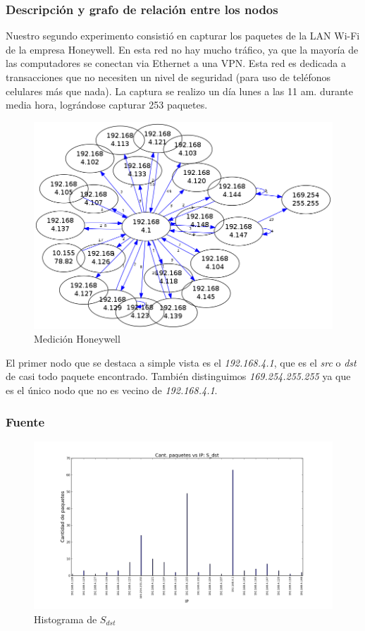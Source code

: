 \subsubsection{Descripción y grafo de relación entre los nodos}

Nuestro segundo experimento consistió en capturar los paquetes de la LAN Wi-Fi de la empresa Honeywell. En esta red no hay mucho tráfico, ya que la mayoría de las computadores se conectan via Ethernet a una VPN. Esta red es dedicada a transacciones que no necesiten un nivel de seguridad (para uso de teléfonos celulares más que nada). La captura se realizo un día lunes a las 11 am. durante media hora, lográndose capturar 253 paquetes.  

\begin{figure}[H]
 \begin{center}
  \includegraphics[width=0.7\linewidth]{../imgs/red-honeywell_red.png}
  \caption{Medición Honeywell}
 \end{center}
\end{figure}

El primer nodo que se destaca a simple vista es el \emph{192.168.4.1}, que es el \emph{src} o \emph{dst} de casi todo paquete encontrado.
También distinguimos \emph{169.254.255.255} ya que es el único nodo que no es vecino de \emph{192.168.4.1}.

\subsubsection{Fuente}

\begin{figure}[H]\centering
    \includegraphics[width=0.8\linewidth]{../imgs/red-honeywell_S_dst_hist.png}
    \caption{Histograma de $S_{dst}$}\label{fig:Honeywell-dst-hist}
\end{figure}

